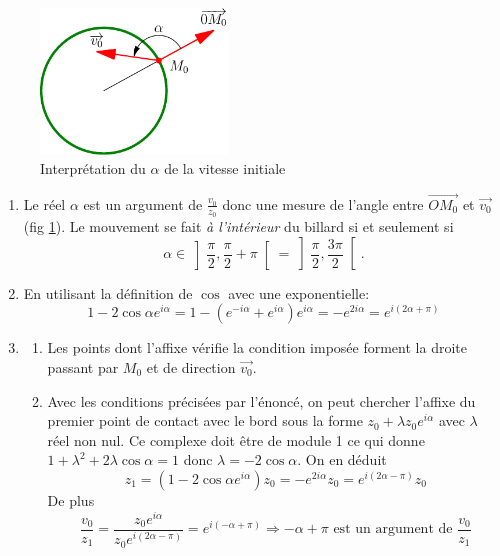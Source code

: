 \begin{figure}[h]
  \centering
  \includegraphics[width=5cm]{./Cbillard_1.pdf}
  \caption{Interprétation du $\alpha$ de la vitesse initiale}
  \label{fig: Cbilliard_1}
\end{figure}

\begin{enumerate}
  \item \label{alphainit} Le réel $\alpha$ est un argument de $\frac{v_0}{z_0}$ donc une mesure de l'angle entre $\overrightarrow{OM_0}$ et $\overrightarrow{v_0}$ (fig \ref{fig: Cbilliard_1}). Le mouvement se fait \emph{à l'intérieur} du billard si et seulement si
\begin{displaymath}
  \alpha \in \left] \frac{\pi}{2} , \frac{\pi}{2} + \pi\right[ = \left] \frac{\pi}{2} , \frac{3\pi}{2}\right[.
\end{displaymath}
  \item En utilisant la définition de $\cos$ avec une exponentielle:
\begin{displaymath}
  1-2\cos\alpha e^{i\alpha} = 1-\left(e^{-i\alpha} + e^{i\alpha} \right)e^{i\alpha} =- e^{2i\alpha} = e^{i(2\alpha + \pi)}
\end{displaymath}

  \item \begin{enumerate}
\item Les points dont l'affixe vérifie la condition imposée forment la droite passant par $M_0$ et de direction $\overrightarrow{v_0}$.
\item \label{premchoc}Avec les conditions précisées par l'énoncé, on peut chercher l'affixe du premier point de contact avec le bord sous la forme $z_0 + \lambda z_0 e^{i\alpha}$ avec $\lambda$ réel non nul. Ce complexe doit être de module 1 ce qui donne $1+\lambda^{2}+2\lambda \cos\alpha =1$ donc $\lambda=-2\cos\alpha$. On en déduit 
\begin{displaymath}
z_1 = (1-2\cos\alpha e^{i\alpha})z_0 = -e^{2i\alpha}z_0 = e^{i(2\alpha - \pi)}z_0  
\end{displaymath}
De plus
\begin{displaymath}
  \frac{v_0}{z_1} = \frac{z_0 e^{i\alpha}}{z_0 e^{i(2\alpha - \pi)}} = e^{i(-\alpha + \pi)}
  \Rightarrow -\alpha + \pi \text{ est un argument de } \frac{v_0}{z_1}
\end{displaymath}
\end{enumerate}


\end{enumerate}

